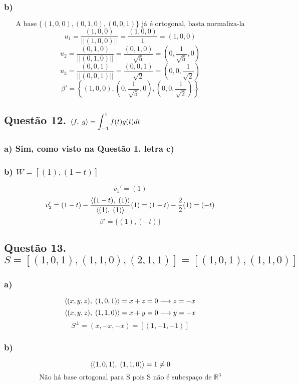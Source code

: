 \documentclass[12pt]{article}
\begin{document}
\subsubsection{b)}

\[\text{A base } \lbrace (1,0,0), (0,1,0), (0,0,1) \rbrace \text{ já é ortogonal, basta normaliza-la}\]
\[u_{1} = \dfrac{(1,0,0)}{||(1,0,0)||} = \dfrac{(1,0,0)}{1} = (1,0,0)\]
\[u_{2} = \dfrac{(0,1,0)}{||(0,1,0)||} = \dfrac{(0,1,0)}{\sqrt{5}} = \left(0,\dfrac{1}{\sqrt{5}},0\right)\]
\[u_{3} = \dfrac{(0,0,1)}{||(0,0,1)||} = \dfrac{(0,0,1)}{\sqrt{2}} = \left(0,0,\dfrac{1}{\sqrt{2}}\right)\]
\[\beta' = \left\lbrace (1,0,0), \left(0,\dfrac{1}{\sqrt{5}},0\right), \left(0,0,\dfrac{1}{\sqrt{2}}\right) \right\rbrace\]

\subsection{Questão 12. $\left\langle f,\;g\right\rangle = \displaystyle \int_{-1}^{1} f(t)g(t)dt$}
\subsubsection{a) Sim, como visto na Questão 1. letra c)}
\subsubsection{b) $W = [(1),(1-t)]$}

\[v_{1}' = (1)\]
\[v_{2}' = (1-t) - \dfrac{\left\langle(1-t),\;(1)\right\rangle}{\left\langle(1),\;(1)\right\rangle}(1) = (1-t) - \dfrac{2}{2}(1) = (-t)\]
\[\beta' = \lbrace (1), (-t) \rbrace\]

\subsection{Questão 13. $S = [(1,0,1),(1,1,0),(2,1,1)] = [(1,0,1),(1,1,0)]$}
\subsubsection{a)}

\[\left\langle(x,y,z),\;(1,0,1)\right\rangle = x+z = 0 \longrightarrow z = -x\]
\[\left\langle(x,y,z),\;(1,1,0)\right\rangle = x+y = 0 \longrightarrow y = -x\]
\[S^{\perp} = (x,-x,-x) = [(1,-1,-1)]\]

\subsubsection{b)}

\[\left\langle(1,0,1),\;(1,1,0)\right\rangle = 1 \neq 0\]
\[\text{Não há base ortogonal para S pois S não é subespaço de } \mathds{R}^{3}\]
\end{document}
